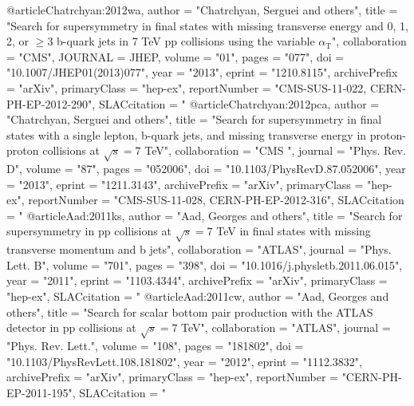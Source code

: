 @article{Chatrchyan:2012wa,
      author         = "Chatrchyan, Serguei and others",
      title          = "{Search for supersymmetry in final states with missing
                        transverse energy and 0, 1, 2, or $\geq 3$ b-quark jets
                        in 7 TeV pp collisions using the variable $\alpha_{\mathrm T}$}",
      collaboration  = "CMS",
      JOURNAL        = {JHEP},
      volume         = "01",
      pages          = "077",
      doi            = "10.1007/JHEP01(2013)077",
      year           = "2013",
      eprint         = "1210.8115",
      archivePrefix  = "arXiv",
      primaryClass   = "hep-ex",
      reportNumber   = "CMS-SUS-11-022, CERN-PH-EP-2012-290",
      SLACcitation   = "%
}
@article{Chatrchyan:2012pca,
      author         = "Chatrchyan, Serguei and others",
      title          = "{Search for supersymmetry in final states with a single
                        lepton, b-quark jets, and missing transverse energy in
                        proton-proton collisions at $\sqrt{s} = 7$ TeV}",
      collaboration  = "CMS ",
      journal        = "Phys. Rev. D",
      volume         = "87",
      pages          = "052006",
      doi            = "10.1103/PhysRevD.87.052006",
      year           = "2013",
      eprint         = "1211.3143",
      archivePrefix  = "arXiv",
      primaryClass   = "hep-ex",
      reportNumber   = "CMS-SUS-11-028, CERN-PH-EP-2012-316",
      SLACcitation   = "%
}
@article{Aad:2011ks,
      author         = "Aad, Georges and others",
      title          = "{Search for supersymmetry in pp collisions at
                        $\sqrt{s}=7$ TeV in final states with missing transverse
                        momentum and b jets}",
      collaboration  = "ATLAS",
      journal        = "Phys. Lett. B",
      volume         = "701",
      pages          = "398",
      doi            = "10.1016/j.physletb.2011.06.015",
      year           = "2011",
      eprint         = "1103.4344",
      archivePrefix  = "arXiv",
      primaryClass   = "hep-ex",
      SLACcitation   = "%
}
@article{Aad:2011cw,
      author         = "Aad, Georges and others",
      title          = "{Search for scalar bottom pair production with the ATLAS
                        detector in pp collisions at $\sqrt{s}=7$ TeV}",
      collaboration  = "ATLAS",
      journal        = "Phys. Rev. Lett.",
      volume         = "108",
      pages          = "181802",
      doi            = "10.1103/PhysRevLett.108.181802",
      year           = "2012",
      eprint         = "1112.3832",
      archivePrefix  = "arXiv",
      primaryClass   = "hep-ex",
      reportNumber   = "CERN-PH-EP-2011-195",
      SLACcitation   = "%
}

